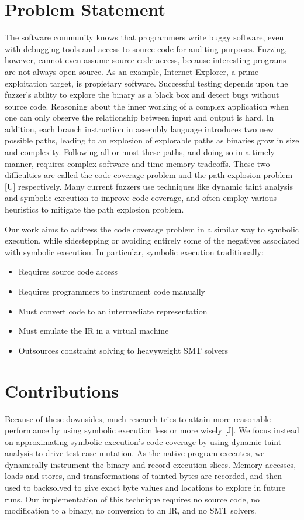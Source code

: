 \documentclass[11pt,expanded,copyright]{fsuthesis}
\begin{document}
\section{Problem Statement}

The software community knows that programmers write buggy software, even with debugging tools and access to source code for auditing purposes. Fuzzing, however, cannot even assume source code access, because interesting programs are not always open source. As an example, Internet Explorer, a prime exploitation target, is propietary software. Successful testing depends upon the fuzzer's ability to explore the binary as a black box and detect bugs without source code. Reasoning about the inner working of a complex application when one can only observe the relationship between input and output is hard. In addition, each branch instruction in assembly language introduces two new possible paths, leading to an explosion of explorable paths as binaries grow in size and complexity. Following all or most these paths, and doing so in a timely manner, requires complex software and time-memory tradeoffs. These two difficulties are called the code coverage problem and the path explosion problem [U] respectively. Many current fuzzers use techniques like dynamic taint analysis and symbolic execution to improve code coverage, and often employ various heuristics to mitigate the path explosion problem.

Our work aims to address the code coverage problem in a similar way to symbolic execution, while sidestepping or avoiding entirely some of the negatives associated with symbolic execution. In particular, symbolic execution traditionally:

\begin{itemize}
	\item Requires source code access
	\item Requires programmers to instrument code manually
	\item Must convert code to an intermediate representation
	\item Must emulate the IR in a virtual machine
	\item Outsources constraint solving to heavyweight SMT solvers
\end{itemize}

\section{Contributions}

Because of these downsides, much research tries to attain more reasonable performance by using symbolic execution less or more wisely [J]. We focus instead on approximating symbolic execution's code coverage by using dynamic taint analysis to drive test case mutation. As the native program executes, we dynamically instrument the binary and record execution slices. Memory accesses, loads and stores, and transformations of tainted bytes are recorded, and then used to backsolved to give exact byte values and locations to explore in future runs. Our implementation of this technique requires no source code, no modification to a binary, no conversion to an IR, and no SMT solvers.
\end{document}
